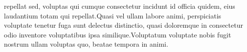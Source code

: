 \documentclass[letterpaper]{article} %
\begin{document}
repellat sed, voluptas qui cumque consectetur incidunt id officia quidem, eius laudantium totam qui repellat.Quasi vel ullam labore animi, perspiciatis voluptate tenetur fuga sunt delectus distinctio, quasi doloremque in consectetur odio inventore voluptatibus ipsa similique.Voluptatum voluptate nobis fugit nostrum ullam voluptas quo, beatae tempora in animi.\clearpage


\end{document}
